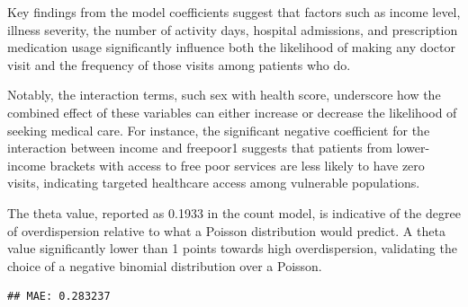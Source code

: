 \documentclass[
]{article}
\newenvironment{Shaded}{\begin{snugshade}}{\end{snugshade}}
\newcommand{\AttributeTok}[1]{\textcolor[rgb]{0.13,0.29,0.53}{#1}}
\newcommand{\DecValTok}[1]{\textcolor[rgb]{0.00,0.00,0.81}{#1}}
\newcommand{\FunctionTok}[1]{\textcolor[rgb]{0.13,0.29,0.53}{\textbf{#1}}}
\newcommand{\NormalTok}[1]{#1}
\newcommand{\OtherTok}[1]{\textcolor[rgb]{0.56,0.35,0.01}{#1}}
\newcommand{\SpecialCharTok}[1]{\textcolor[rgb]{0.81,0.36,0.00}{\textbf{#1}}}
\newcommand{\StringTok}[1]{\textcolor[rgb]{0.31,0.60,0.02}{#1}}
\begin{document}
Key findings from the model coefficients suggest that factors such as
income level, illness severity, the number of activity days, hospital
admissions, and prescription medication usage significantly influence
both the likelihood of making any doctor visit and the frequency of
those visits among patients who do.

Notably, the interaction terms, such sex with health score, underscore
how the combined effect of these variables can either increase or
decrease the likelihood of seeking medical care. For instance, the
significant negative coefficient for the interaction between income and
freepoor1 suggests that patients from lower-income brackets with access
to free poor services are less likely to have zero visits, indicating
targeted healthcare access among vulnerable populations.

The theta value, reported as 0.1933 in the count model, is indicative of
the degree of overdispersion relative to what a Poisson distribution
would predict. A theta value significantly lower than 1 points towards
high overdispersion, validating the choice of a negative binomial
distribution over a Poisson.

\begin{Shaded}
\end{Shaded}

\begin{verbatim}
## MAE: 0.283237
\end{verbatim}
\end{document}
